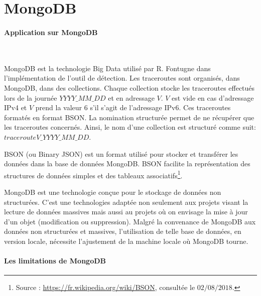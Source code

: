 \section{MongoDB}
\paragraph{ Application sur  MongoDB}~


MongoDB est la technologie Big Data utilisé par R. Fontugne dans l'implémentation de l'outil de détection. Les traceroutes sont organisés, dans MongoDB, dans des collections.  Chaque collection stocke les traceroutes effectués lors de la journée $YYYY\_MM\_DD$ et en adressage $V$. $V$ est vide en cas d'adressage IPv4 et $V$ prend la valeur $6$ s'il s'agit de l'adressage IPv6. Ces traceroutes formatés en format BSON. La nomination structurée permet de ne récupérer que les traceroutes concernés. Ainsi, le nom d'une collection est structuré comme suit: 	$tracerouteV\_YYYY\_MM\_DD$.
 
 \begin{tcolorbox}
 	BSON (ou Binary JSON) est un format utilisé pour stocker et transférer les données dans la base de données MongoDB. BSON facilite la représentation des structures de données simples et des tableaux associatifs\footnote{Source : \url{https://fr.wikipedia.org/wiki/BSON}, consultée le $ 02/08/2018 $.}.
 \end{tcolorbox}
 
 MongoDB est une technologie conçue pour le stockage de données non structurées. C'est une technologies adaptée non seulement aux projets visant la lecture de données massives mais aussi au projets où on envisage la mise à jour d'un objet (modification ou suppression). Malgré la convenance de MongoDB aux données non structurées et massives, l'utilisation de telle base de données, en version locale, nécessite l'ajustement de la machine locale où MongoDB tourne. 


\paragraph{Les limitations de MongoDB}

